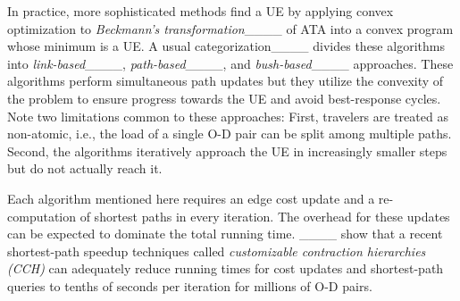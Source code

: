     In practice, more sophisticated methods find a UE by applying convex optimization to \emph{Beckmann's transformation}____ of ATA into a convex program whose minimum is a UE.
    A usual categorization____ divides these algorithms into \emph{link-based}____, \emph{path-based}____, and \emph{bush-based}____ approaches.
    These algorithms perform simultaneous path updates but they utilize the convexity of the problem to ensure progress towards the UE and avoid best-response cycles. 
    Note two limitations common to these approaches:
    First, travelers are treated as non-atomic, i.e., the load of a single O-D pair can be split among multiple paths.
    Second, the algorithms iteratively approach the UE in increasingly smaller steps but do not actually reach it.
    
    Each algorithm mentioned here requires an edge cost update and a re-computation of shortest paths in every iteration.
    The overhead for these updates can be expected to dominate the total running time. 
    ____ show that a recent shortest-path speedup techniques called \emph{customizable contraction hierarchies (CCH)} can adequately reduce running times for cost updates and shortest-path queries to tenths of seconds per iteration for millions of O-D pairs.